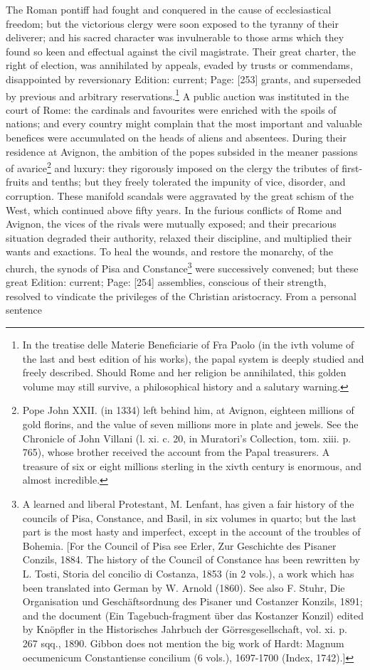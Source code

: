 The Roman pontiff had fought and conquered in the cause of ecclesiastical freedom; but the victorious clergy were soon exposed to the tyranny of their deliverer; and his sacred character was invulnerable to those arms which they found so keen and effectual against the civil magistrate. Their great charter, the right of election, was annihilated by appeals, evaded by trusts or commendams, disappointed by reversionary Edition: current; Page: [253] grants, and superseded by previous and arbitrary reservations.\footnote{In the treatise delle Materie Beneficiarie of Fra Paolo (in the ivth volume of the last and best edition of his works), the papal system is deeply studied and freely described. Should Rome and her religion be annihilated, this golden volume may still survive, a philosophical history and a salutary warning.} A public auction was instituted in the court of Rome: the cardinals and favourites were enriched with the spoils of nations; and every country might complain that the most important and valuable benefices were accumulated on the heads of aliens and absentees. During their residence at Avignon, the ambition of the popes subsided in the meaner passions of avarice\footnote{Pope John XXII. (in 1334) left behind him, at Avignon, eighteen millions of gold florins, and the value of seven millions more in plate and jewels. See the Chronicle of John Villani (l. xi. c. 20, in Muratori\texthebrew{}’s Collection, tom. xiii. p. 765), whose brother received the account from the Papal treasurers. A treasure of six or eight millions sterling in the xivth century is enormous, and almost incredible.} and luxury: they rigorously imposed on the clergy the tributes of first-fruits and tenths; but they freely tolerated the impunity of vice, disorder, and corruption. These manifold scandals were aggravated by the great schism of the West, which continued above fifty years. In the furious conflicts of Rome and Avignon, the vices of the rivals were mutually exposed; and their precarious situation degraded their authority, relaxed their discipline, and multiplied their wants and exactions. To heal the wounds, and restore the monarchy, of the church, the synods of Pisa and Constance\footnote{A learned and liberal Protestant, M. Lenfant, has given a fair history of the councils of Pisa, Constance, and Basil, in six volumes in quarto; but the last part is the most hasty and imperfect, except in the account of the troubles of Bohemia. [For the Council of Pisa see Erler, Zur Geschichte des Pisaner Conzils, 1884. The history of the Council of Constance has been rewritten by L. Tosti, Storia del concilio di Costanza, 1853 (in 2 vols.), a work which has been translated into German by W. Arnold (1860). See also F. Stuhr, Die Organisation und Geschäftsordnung des Pisaner und Costanzer Konzils, 1891; and the document (Ein Tagebuch-fragment über das Kostanzer Konzil) edited by Knöpfler in the Historisches Jahrbuch der Görresgesellschaft, vol. xi. p. 267 sqq., 1890. Gibbon does not mention the big work of Hardt: Magnum oecumenicum Constantiense concilium (6 vols.), 1697-1700 (Index, 1742).]} were successively convened; but these great Edition: current; Page: [254] assemblies, conscious of their strength, resolved to vindicate the privileges of the Christian aristocracy. From a personal sentence 